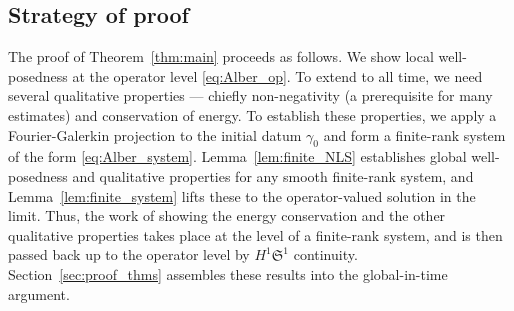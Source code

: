 \documentclass[11pt]{amsart}
\theoremstyle{definition}
\newcommand{\Sp}{\mathfrak{S}}
\begin{document}
\subsection{Strategy of proof}\label{subsec:strategy}




The proof of Theorem~\ref{thm:main} proceeds as follows. We show local well-posedness at the operator level \eqref{eq:Alber_op}. To extend to all time, we need several qualitative properties --- chiefly non-negativity (a prerequisite for many estimates) and conservation of energy. To establish these properties, we apply a Fourier-Galerkin projection to the initial datum $\gamma_0$ and form a finite-rank system of the form \eqref{eq:Alber_system}. Lemma~\ref{lem:finite_NLS} establishes global well-posedness and qualitative properties for any smooth finite-rank system, and Lemma~\ref{lem:finite_system} lifts these to the operator-valued solution in the limit. Thus, the work of showing the energy conservation and the other qualitative properties takes place at the level of a finite-rank system, and is then passed back up to the operator level by $H^1\Sp^1$ continuity. Section~\ref{sec:proof_thms} assembles these results into the global-in-time argument.

\smallskip
\end{document}
